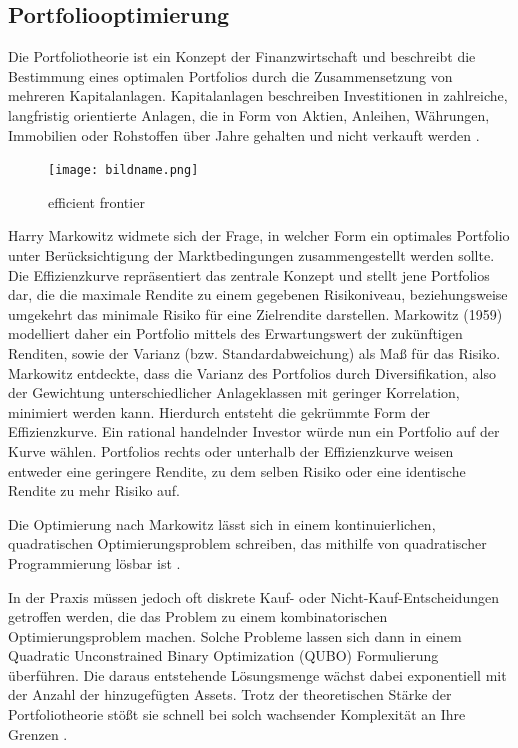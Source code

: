\subsection{Portfoliooptimierung}
Die Portfoliotheorie ist ein Konzept der Finanzwirtschaft und beschreibt die Bestimmung eines optimalen Portfolios durch die Zusammensetzung von mehreren Kapitalanlagen. Kapitalanlagen beschreiben Investitionen in zahlreiche, langfristig orientierte Anlagen, die in Form von Aktien, Anleihen, Währungen, Immobilien oder Rohstoffen über Jahre gehalten und nicht verkauft werden \cite{orus_quantum_2019, sakuler_real-world_2025}.

\begin{figure}[h]
  \centering
  \texttt{[image: bildname.png]}
  \caption{efficient frontier}
  \label{fig:beispielbild}
\end{figure}

Harry Markowitz widmete sich der Frage, in welcher Form ein optimales Portfolio unter Berücksichtigung der Marktbedingungen zusammengestellt werden sollte. Die Effizienzkurve repräsentiert das zentrale Konzept und stellt jene Portfolios dar, die die maximale Rendite zu einem gegebenen Risikoniveau, beziehungsweise umgekehrt das minimale Risiko für eine Zielrendite darstellen. Markowitz (1959) modelliert daher ein Portfolio mittels des Erwartungswert der zukünftigen Renditen, sowie der Varianz (bzw. Standardabweichung) als Maß für das Risiko. Markowitz entdeckte, dass die Varianz des Portfolios durch Diversifikation, also der Gewichtung unterschiedlicher Anlageklassen mit geringer Korrelation, minimiert werden kann. Hierdurch entsteht die gekrümmte Form der Effizienzkurve. Ein rational handelnder Investor würde nun ein Portfolio auf der Kurve wählen. Portfolios rechts oder unterhalb der Effizienzkurve weisen entweder eine geringere Rendite, zu dem selben Risiko oder eine identische Rendite zu mehr Risiko auf.

Die Optimierung nach Markowitz lässt sich in einem kontinuierlichen, quadratischen Optimierungsproblem schreiben, das mithilfe von quadratischer Programmierung lösbar ist
\cite{Markowitz 1959}.

In der Praxis müssen jedoch oft diskrete Kauf- oder Nicht-Kauf-Entscheidungen getroffen werden, die das Problem zu einem kombinatorischen Optimierungsproblem machen. Solche Probleme lassen sich dann in einem Quadratic Unconstrained Binary Optimization (QUBO) Formulierung überführen. Die daraus entstehende Lösungsmenge wächst dabei exponentiell mit der Anzahl der hinzugefügten Assets.
Trotz der theoretischen Stärke der Portfoliotheorie stößt sie schnell bei solch wachsender Komplexität an Ihre Grenzen \cite{sakuler_real-world_2025, orus_quantum_2019}.

